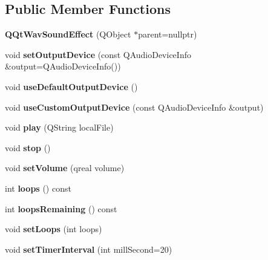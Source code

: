 \subsection*{Public Member Functions}
\begin{DoxyCompactItemize}
\item 
\mbox{\label{class_q_qt_wav_sound_effect_aa372a16e10d2e536ff4723818bc3f4f0}} 
{\bfseries Q\+Qt\+Wav\+Sound\+Effect} (Q\+Object $\ast$parent=nullptr)
\item 
\mbox{\label{class_q_qt_wav_sound_effect_aa6cdfa7f5c9b040f881e60242d9d89f8}} 
void {\bfseries set\+Output\+Device} (const Q\+Audio\+Device\+Info \&output=Q\+Audio\+Device\+Info())
\item 
\mbox{\label{class_q_qt_wav_sound_effect_a56fa036b7a0fae30a91b4e4f87334365}} 
void {\bfseries use\+Default\+Output\+Device} ()
\item 
\mbox{\label{class_q_qt_wav_sound_effect_a55c5a2a874de819d5b3c9e9dc2f7dea6}} 
void {\bfseries use\+Custom\+Output\+Device} (const Q\+Audio\+Device\+Info \&output)
\item 
\mbox{\label{class_q_qt_wav_sound_effect_adc77271bb6902136a2876b241c7bfc1b}} 
void {\bfseries play} (Q\+String local\+File)
\item 
\mbox{\label{class_q_qt_wav_sound_effect_a05ab01e0e6f13a2f9d91ad6b53894338}} 
void {\bfseries stop} ()
\item 
\mbox{\label{class_q_qt_wav_sound_effect_af5de5570124e78ccf4eff842b28b897f}} 
void {\bfseries set\+Volume} (qreal volume)
\item 
\mbox{\label{class_q_qt_wav_sound_effect_ad9a9c683a3e47d8a8f8bf47b52bc0b87}} 
int {\bfseries loops} () const
\item 
\mbox{\label{class_q_qt_wav_sound_effect_ad20fc1a74ff6f98a731361db77de49a8}} 
int {\bfseries loops\+Remaining} () const
\item 
\mbox{\label{class_q_qt_wav_sound_effect_a1d75f5e00da7d9ea359e4865b81d74aa}} 
void {\bfseries set\+Loops} (int loops)
\item 
\mbox{\label{class_q_qt_wav_sound_effect_a37d01fc3a0a13352876115d71e37eeed}} 
void {\bfseries set\+Timer\+Interval} (int mill\+Second=20)
\end{DoxyCompactItemize}
